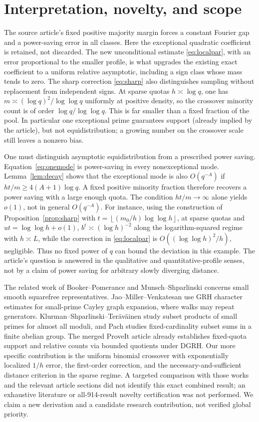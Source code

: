 \documentclass[11pt]{article}
\theoremstyle{remark}\newtheorem{remark}[theorem]{Remark}
\newcommand{\floor}[1]{\left\lfloor #1\right\rfloor}
\begin{document}
\section{Interpretation, novelty, and scope}
The source article's fixed positive majority margin forces a constant Fourier gap and a power-saving error in all classes. Here the exceptional quadratic coefficient is retained, not discarded. The new unconditional estimate \eqref{eq:localpar}, with an error proportional to the smaller profile, is what upgrades the existing exact coefficient to a uniform relative asymptotic, including a sign class whose mass tends to zero. The sharp correction \eqref{eq:sharp} also distinguishes sampling without replacement from independent signs. At sparse quotas $h\asymp\log q$, one has $m\asymp (\log q)^2/\log\log q$ uniformly at positive density, so the crossover minority count is of order $\log q/\log\log q$. This is far smaller than a fixed fraction of the pool. In particular one exceptional prime guarantees support (already implied by the article), but not equidistribution; a growing number on the crossover scale still leaves a nonzero bias.

One must distinguish asymptotic equidistribution from a prescribed power saving. Equation~\eqref{eq:onemode} is power-saving in every nonexceptional mode. Lemma~\ref{lem:decay} shows that the exceptional mode is also $O(q^{-A})$ if $ht/m\ge4(A+1)\log q$. A fixed positive minority fraction therefore recovers a power saving with a large enough quota. The condition $ht/m\to\infty$ alone yields $o(1)$, not in general $O(q^{-A})$. For instance, using the construction of Proposition~\ref{prop:sharp} with $t=\floor{(m_0/h)\log\log h}$, at sparse quotas and $ut=\log\log h+o(1)$, $b^t\asymp (\log h)^{-2}$ along the logarithm-squared regime with $h\asymp L$, while the correction in \eqref{eq:localpar} is $O((\log\log h)^2/h)$, negligible. Thus no fixed power of $q$ can bound the deviation in this example. The article's question is answered in the qualitative and quantitative-profile senses, not by a claim of power saving for arbitrary slowly diverging distance.

The related work of Booker--Pomerance \cite{BP} and Munsch--Shparlinski \cite{MS} concerns small smooth squarefree representatives. Jao--Miller--Venkatesan \cite{JMV} use GRH character estimates for small-prime Cayley graph expansion, where walks may repeat generators. Klurman--Shparlinski--Ter\"av\"ainen \cite{KST} study subset products of small primes for almost all moduli, and Pach \cite{Pach} studies fixed-cardinality subset sums in a finite abelian group. The merged ProveIt article already establishes fixed-quota support and relative counts via bounded quotients under DGRH. Our more specific contribution is the uniform binomial crossover with exponentially localized $1/h$ error, the first-order correction, and the necessary-and-sufficient distance criterion in the sparse regime. A targeted comparison with those works and the relevant article sections did not identify this exact combined result; an exhaustive literature or all-914-result novelty certification was not performed. We claim a new derivation and a candidate research contribution, not verified global priority.
\end{document}
